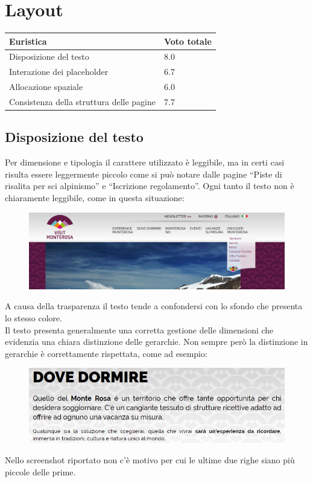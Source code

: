     \section{Layout}
    \begin{table}[H]
        \begin{tabular}{|l|l|}
        \hline \textbf{Euristica} & \textbf{Voto totale} \\ \hline
        Disposizione del testo                      & 8.0 \\ \hline
        Interazione dei placeholder                 & 6.7 \\ \hline
        Allocazione spaziale                        & 6.0 \\ \hline
        Consistenza della struttura delle pagine    & 7.7 \\ \hline
        \end{tabular}
        \end{table}
        \subsection{Disposizione del testo}
        Per dimensione e tipologia il carattere utilizzato è leggibile, ma in
        certi casi risulta essere leggermente piccolo come si può notare  dalle
        pagine “Piste di risalita per sci alpinismo” e “Iscrizione regolamento”.
        Ogni tanto il testo non è chiaramente leggibile, come in questa
        situazione:
        \begin{figure}[H]
            \centering
            \includegraphics[scale=0.15]{resources/images/textLayout2.png}
        \end{figure}
        A causa della trasparenza il testo tende a confondersi con lo sfondo che
        presenta lo stesso colore.\\
        Il testo presenta generalmente una corretta gestione delle dimensioni che
        evidenzia una chiara distinzione delle gerarchie. Non sempre però la 
        distinzione in gerarchie è correttamente rispettata, come ad esempio:
        \begin{figure}[H] 
            \centering
            \includegraphics[scale=0.6]{resources/images/textLayout4.jpg}
        \end{figure}
        Nello screenshot riportato non c'è motivo per cui le ultime due righe
        siano più piccole delle prime.

